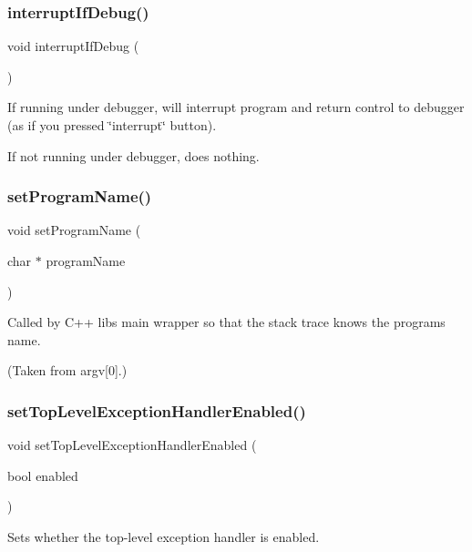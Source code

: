 \subsubsection{\texorpdfstring{interrupt\+If\+Debug()}{interruptIfDebug()}}
{\footnotesize\ttfamily void interrupt\+If\+Debug (\begin{DoxyParamCaption}{ }\end{DoxyParamCaption})}



If running under debugger, will interrupt program and return control to debugger (as if you pressed \char`\"{}interrupt\char`\"{} button). 

If not running under debugger, does nothing. \mbox{\label{namespacesgl_1_1exceptions_a47c669ec573608d439258c48c202d58a}} 
\subsubsection{\texorpdfstring{set\+Program\+Name()}{setProgramName()}}
{\footnotesize\ttfamily void set\+Program\+Name (\begin{DoxyParamCaption}\item[{char $\ast$}]{program\+Name }\end{DoxyParamCaption})}



Called by C++ lib\textquotesingle{}s main wrapper so that the stack trace knows the program\textquotesingle{}s name. 

(Taken from argv\mbox{[}0\mbox{]}.) \mbox{\label{namespacesgl_1_1exceptions_aecffab3c2119276b44cb55564b11e520}} 
\subsubsection{\texorpdfstring{set\+Top\+Level\+Exception\+Handler\+Enabled()}{setTopLevelExceptionHandlerEnabled()}}
{\footnotesize\ttfamily void set\+Top\+Level\+Exception\+Handler\+Enabled (\begin{DoxyParamCaption}\item[{bool}]{enabled }\end{DoxyParamCaption})}



Sets whether the top-\/level exception handler is enabled. 

